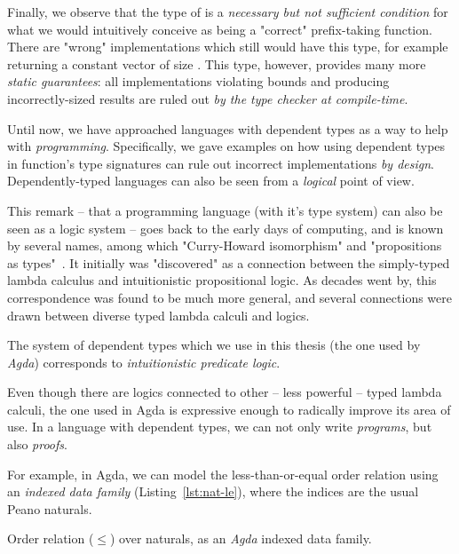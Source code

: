             Finally, we observe that the type of  is a \emph{necessary but not sufficient condition}
            for what we would intuitively conceive as being a "correct" prefix-taking function.
            There are "wrong" implementations which still would have this type, for example
            returning a constant vector of size .
            This type, however, provides many more \emph{static guarantees}:
            all implementations violating bounds and producing incorrectly-sized results
            are ruled out \emph{by the type checker at compile-time}.

            Until now, we have approached languages with dependent types as a way to help with \emph{programming}.
            Specifically, we gave examples on how using dependent types in function's type signatures
            can rule out incorrect implementations \emph{by design}.
            Dependently-typed languages can also be seen from a \emph{logical} point of view.

            This remark – that a programming language (with it's type system) can also be seen
            as a logic system – goes back to the early days of computing, and is known by several names,
            among which "Curry-Howard isomorphism" and "propositions as types"~\cite{propositions-as-types}.
            It initially was "discovered" as a connection between the simply-typed lambda calculus
            and intuitionistic propositional logic.
            As decades went by, this correspondence was found to be much more general,
            and several connections were drawn between diverse typed lambda calculi and logics.

            The system of dependent types which we use in this thesis (the one used by \emph{Agda})
            corresponds to \emph{intuitionistic predicate logic}.

            Even though there are logics connected to other – less powerful – typed lambda calculi,
            the one used in Agda is expressive enough to radically improve its area of use.
            In a language with dependent types, we can not only write \emph{programs}, but also \emph{proofs}.

            For example, in Agda, we can model the less-than-or-equal order relation using an
            \emph{indexed data family} (Listing~\ref{lst:nat-le}),
            where the indices are the usual Peano naturals.

            \begin{listing}[h]
                \caption{Order relation ($\le$) over naturals, as an \emph{Agda} indexed data family.
                    \label{lst:nat-le}}
            \end{listing}


